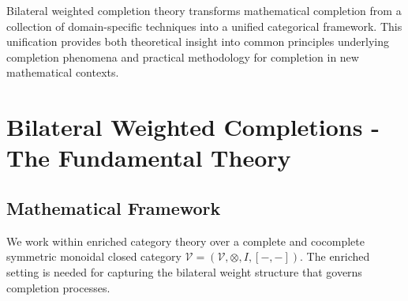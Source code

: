 \documentclass[11pt]{article}
\theoremstyle{plain}
\theoremstyle{definition}
\theoremstyle{remark}
\newcommand{\V}{\mathcal{V}}
\newcommand{\tensor}{\otimes}
\begin{document}
Bilateral weighted completion theory transforms mathematical completion from a collection of domain-specific techniques into a unified categorical framework. This unification provides both theoretical insight into common principles underlying completion phenomena and practical methodology for completion in new mathematical contexts.

\section{Bilateral Weighted Completions - The Fundamental Theory}

\subsection{Mathematical Framework}

We work within enriched category theory over a complete and cocomplete symmetric monoidal closed category $\V = (\V, \tensor, I, [-,-])$. The enriched setting is needed for capturing the bilateral weight structure that governs completion processes.
\end{document}

